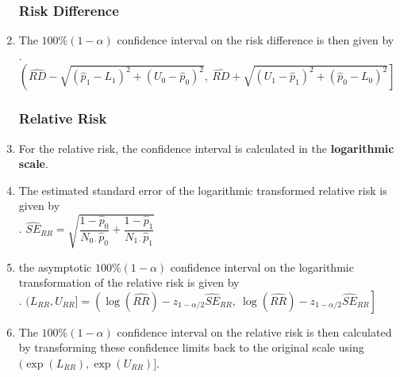 \begin{enumerate}
\subsubsection{Risk Difference}

    \item The $100\%(1 - \alpha)$ confidence interval on the risk difference is then given by
    \hfill \cite{statistics/book/Statistics-for-Data-Scientists/Maurits-Kaptein}
    \\
    .\hfill
    $
        \left(
            \hat{R D} - \sqrt{(\hat{p}_1 - L_1)^2 + (U_0 - \hat{p}_0)^2},
            \ \hat{R D} + \sqrt{(U_1 - \hat{p}_1)^2 + (\hat{p}_0 - L_0)^2}
        \right]
    $
    \hfill \cite{statistics/book/Statistics-for-Data-Scientists/Maurits-Kaptein}

\subsubsection{Relative Risk}

    \item For the relative risk, the confidence interval is calculated in the \textbf{logarithmic scale}.
    \hfill \cite{statistics/book/Statistics-for-Data-Scientists/Maurits-Kaptein}

    \item The estimated standard error of the logarithmic transformed relative risk is given by
    \hfill \cite{statistics/book/Statistics-for-Data-Scientists/Maurits-Kaptein}
    \\
    .\hfill
    $
        \hat{SE}_{RR} = \sqrt{
            \dfrac{1 - \hat{p}_0}{N_{0\cdot } \hat{p}_0}
            + \dfrac{1 - \hat{p}_1}{N_{1\cdot } \hat{p}_1}
        }
    $
    \hfill \cite{statistics/book/Statistics-for-Data-Scientists/Maurits-Kaptein}

    \item the asymptotic $100\%(1 - \alpha)$ confidence interval on the logarithmic transformation of the relative risk is given by
    \hfill \cite{statistics/book/Statistics-for-Data-Scientists/Maurits-Kaptein}
    \\
    .\hfill
    $
        (L_{R R} , U_{R R} ]
        = \left(
            \log( \hat{R R}) - z_{1-\alpha/2} \hat{S E}_{R R},
            \ \log( \hat{R R}) - z_{1-\alpha/2} \hat{S E}_{R R}
        \right]
    $
    \hfill \cite{statistics/book/Statistics-for-Data-Scientists/Maurits-Kaptein}

    \item The $100\%(1 - \alpha)$ confidence interval on the relative risk is then calculated by transforming these confidence limits back to the original scale using $(\exp(L_{R R} ), \exp(U_{R R })]$.
    \hfill \cite{statistics/book/Statistics-for-Data-Scientists/Maurits-Kaptein}


\end{enumerate}
